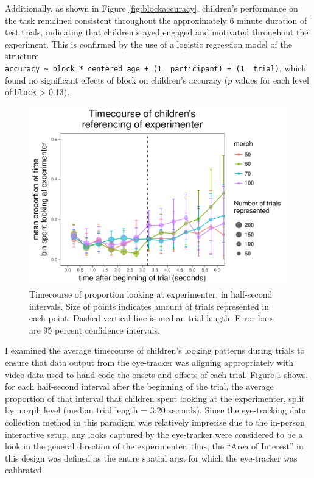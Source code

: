 \documentclass[floatsintext,man]{apa6}
\theoremstyle{definition}
\theoremstyle{definition}
\theoremstyle{definition}
\theoremstyle{remark}
\begin{document}
Additionally, as shown in Figure \ref{fig:blockaccuracy}, children's
performance on the task remained consistent throughout the approximately
6 minute duration of test trials, indicating that children stayed
engaged and motivated throughout the experiment. This is confirmed by
the use of a logistic regression model of the structure
\texttt{accuracy\ \textasciitilde{}\ block\ *\ centered\ age\ +\ (1\ \textbar{}\ participant)\ +\ (1\ \textbar{}\ trial)},
which found no significant effects of block on children's accuracy
(\(p\) values for each level of \texttt{block} \textgreater{} 0.13).

\begin{figure}
\centering
\includegraphics{soc_ref_category_paper_files/figure-latex/forwardtimecourse-1.pdf}
\caption{\label{fig:forwardtimecourse}Timecourse of proportion looking at
experimenter, in half-second intervals. Size of points indicates amount
of trials represented in each point. Dashed vertical line is median
trial length. Error bars are 95 percent confidence intervals.}
\end{figure}

I examined the average timecourse of children's looking patterns during
trials to ensure that data output from the eye-tracker was aligning
appropriately with video data used to hand-code the onsets and offsets
of each trial. Figure \ref{fig:forwardtimecourse} shows, for each
half-second interval after the beginning of the trial, the average
proportion of that interval that children spent looking at the
experimenter, split by morph level (median trial length = 3.20 seconds).
Since the eye-tracking data collection method in this paradigm was
relatively imprecise due to the in-person interactive setup, any looks
captured by the eye-tracker were considered to be a look in the general
direction of the experimenter; thus, the \enquote{Area of Interest} in
this design was defined as the entire spatial area for which the
eye-tracker was calibrated.
\end{document}
